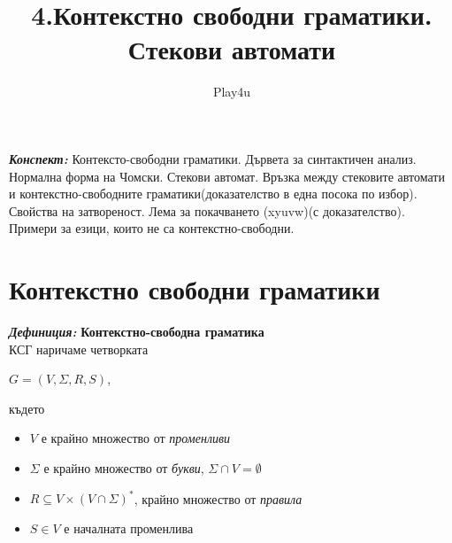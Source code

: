 \documentclass[11pt]{article} %
\title{4.Контекстно свободни граматики. Стекови автомати}
\author{Play4u}
\begin{document}
\maketitle

\newcommand{\lrangle}[1]{\left\langle #1 \right\rangle}

\newcommand{\belongsTo}{\in}
\newcommand{\notBelongsTo}{\centernot\in}

\newcommand{\oversetModels}[1]{\overset{#1}{\models}}

\newcommand{\kda}{A = <Q, X, q_{0}, \delta, F>}
\newcommand{\cfg}{\Gamma = <\mathcal{N}, \mathcal{T}, \mathcal{S}, \mathcal{P}>}
\newcommand{\cfgVers}{G = \langle V, \Sigma, R, S \rangle}
\newcommand{\nsa}{A = <Q, X, Z, q_{0}, z_{0}, \delta, F>}

\newcommand{\italicBold}[1]{\textbf{\emph{#1}}}
\newcommand{\definition}{\italicBold{Дефиниция: }}
\newcommand{\theorem}{\italicBold{Теорема: }}
\newcommand{\lemma}{\italicBold{Лема: }}
\newcommand{\proof}{\italicBold{Доказателство: }}

\newcommand{\curlies}[1]{\{#1\}}

\newcommand{\enumNum}{\renewcommand{\theenumi}{\arabic{enumi}}}
\newcommand{\enumlet}{\renewcommand{\theenumi}{\alph{enumi}}}

\italicBold{Конспект:} Контексто-свободни граматики. Дървета за синтактичен анализ. Нормална форма на Чомски. Стекови автомат. Връзка между стековите автомати и контекстно-свободните граматики(доказателство в една посока по избор). Свойства на затвореност. Лема за покачването (xyuvw)(с доказателство). Примери за езици, които не са контекстно-свободни.

\section{Контекстно свободни граматики}

\definition \textbf{Контекстно-свободна граматика}\\
КСГ наричаме четворката \\
\centerline{$G = (V, \Sigma, R, S)$,}
където
\begin{itemize}[noitemsep]
	\item $V$ е крайно множество от \textit{променливи}
	\item $\Sigma$ е крайно множество от \textit{букви}, $\Sigma\cap V = \emptyset$
	\item $R \subseteq V \times (V \cap \Sigma)^{*}$, крайно множество от \textit{правила}
	\item $S \in V$ е началната променлива
\end{itemize}
\end{document}
